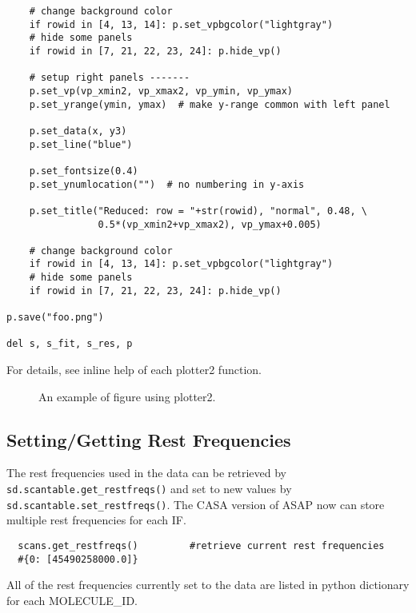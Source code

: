 \begin{verbatim}
    # change background color
    if rowid in [4, 13, 14]: p.set_vpbgcolor("lightgray")
    # hide some panels
    if rowid in [7, 21, 22, 23, 24]: p.hide_vp()

    # setup right panels -------
    p.set_vp(vp_xmin2, vp_xmax2, vp_ymin, vp_ymax)
    p.set_yrange(ymin, ymax)  # make y-range common with left panel

    p.set_data(x, y3)
    p.set_line("blue")

    p.set_fontsize(0.4)
    p.set_ynumlocation("")  # no numbering in y-axis

    p.set_title("Reduced: row = "+str(rowid), "normal", 0.48, \
                0.5*(vp_xmin2+vp_xmax2), vp_ymax+0.005)

    # change background color
    if rowid in [4, 13, 14]: p.set_vpbgcolor("lightgray")
    # hide some panels
    if rowid in [7, 21, 22, 23, 24]: p.hide_vp()

p.save("foo.png")

del s, s_fit, s_res, p
\end{verbatim}
\normalsize

For details, see inline help of each plotter2 function. 

\begin{figure}[h!]
\begin{center}
\caption{\label{fig:plotter2} An example of figure using plotter2.}
\hrulefill
\end{center}
\end{figure}



\subsection{Setting/Getting Rest Frequencies}
\label{subsection:sd.asap.restfreqs}

The rest frequencies used in the data can be retrieved by 
{\tt sd.scantable.get\_restfreqs()} and set to new values by 
{\tt sd.scantable.set\_restfreqs()}.
The CASA version of ASAP now can store multiple rest frequencies 
for each IF.

\small
\begin{verbatim}
  scans.get_restfreqs()         #retrieve current rest frequencies
  #{0: [45490258000.0]}
\end{verbatim}
\normalsize

All of the rest frequencies currently set to the data are listed in
python dictionary for each MOLECULE\_ID.

